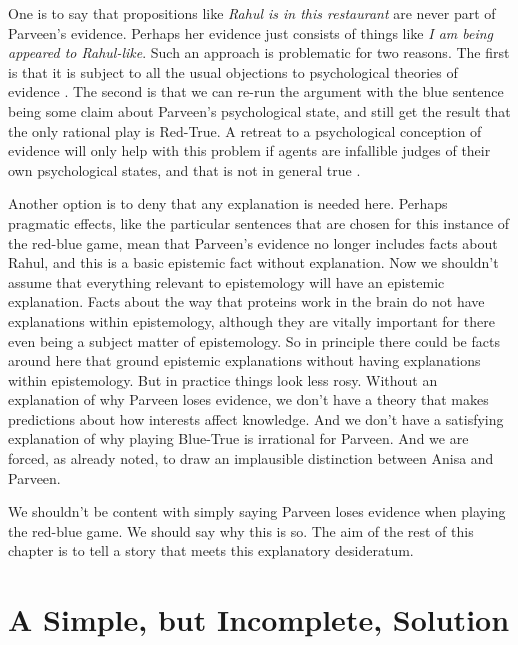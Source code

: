 \documentclass[
  11pt,
]{book}
\begin{document}
One is to say that propositions like \emph{Rahul is in this restaurant} are never part of Parveen's evidence. Perhaps her evidence just consists of things like \emph{I am being appeared to Rahul-like}. Such an approach is problematic for two reasons. The first is that it is subject to all the usual objections to psychological theories of evidence \citep{Williamson2007}. The second is that we can re-run the argument with the blue sentence being some claim about Parveen's psychological state, and still get the result that the only rational play is Red-True. A retreat to a psychological conception of evidence will only help with this problem if agents are infallible judges of their own psychological states, and that is not in general true \citep{Schwitzgebel2008}.

Another option is to deny that any explanation is needed here. Perhaps pragmatic effects, like the particular sentences that are chosen for this instance of the red-blue game, mean that Parveen's evidence no longer includes facts about Rahul, and this is a basic epistemic fact without explanation. Now we shouldn't assume that everything relevant to epistemology will have an epistemic explanation. Facts about the way that proteins work in the brain do not have explanations within epistemology, although they are vitally important for there even being a subject matter of epistemology. So in principle there could be facts around here that ground epistemic explanations without having explanations within epistemology. But in practice things look less rosy. Without an explanation of why Parveen loses evidence, we don't have a theory that makes predictions about how interests affect knowledge. And we don't have a satisfying explanation of why playing Blue-True is irrational for Parveen. And we are forced, as already noted, to draw an implausible distinction between Anisa and Parveen.

We shouldn't be content with simply saying Parveen loses evidence when playing the red-blue game. We should say why this is so. The aim of the rest of this chapter is to tell a story that meets this explanatory desideratum.

\hypertarget{simplesolution}{%
\section{A Simple, but Incomplete, Solution}\label{simplesolution}}
\end{document}
